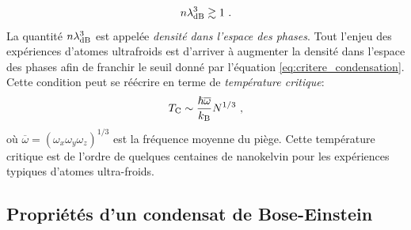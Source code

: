 \begin{equation}
n \lambda_{\mathrm{dB}}^3 \gtrsim 1 \text{ .}
\label{eq:critere_condensation}
\end{equation}
La quantité $n \lambda_{\mathrm{dB}}^3$ est appelée \emph{densité dans l'espace des phases}. Tout l'enjeu des expériences d'atomes ultrafroids est d'arriver à augmenter la densité dans l'espace des phases afin de franchir le seuil donné par l'équation \ref{eq:critere_condensation}. Cette condition peut se réécrire en terme de \emph{température critique}:
\begin{equation}
T_{\mathrm{C}}\sim \frac{\hslash \overline{\omega}}{k_{\mathrm{B}}}N^{1/3} \text{ ,}
\label{eq:temperature_critique}
\end{equation}
où $\overline{\omega}=(\omega_x \omega_y \omega_z)^{1/3}$ est la fréquence moyenne du piège. Cette température critique est de l'ordre de quelques centaines de nanokelvin pour les expériences typiques d'atomes ultra-froids.





\subsection{Propriétés d'un condensat de Bose-Einstein}
\label{sc:propriete_BEC}

